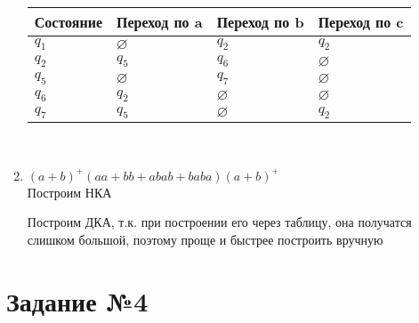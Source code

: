 \documentclass{article}
\begin{document}
\begin{enumerate}
            \begin{tabular} { | l | l | l | l | }
                \hline 
                Состояние & Переход по a & Переход по b & Переход по c \\ \hline
                $q_1$ & $\varnothing$ & $q_2$ & $q_2$ \\ \hline
                $q_2$ & $q_5$ & $q_6$ & $\varnothing$ \\ \hline
                $q_5$ & $\varnothing$ & $q_7$ & $\varnothing$ \\ \hline
                $q_6$ & $q_2$ & $\varnothing$ & $\varnothing$ \\ \hline
                $q_7$ & $q_5$ & $\varnothing$ & $q_2$ \\
                \hline
            \end{tabular} \\  
            
            \begin{center}
            \end{center}
           
            
        \item $(a+b)^+(aa + bb + abab + baba)(a + b)^+$ \\
            Построим НКА
            \begin{center}
            \end{center}
            Построим ДКА, т.к. при построении его через таблицу, она получатся слишком большой, поэтому проще и быстрее построить вручную
            
            \begin{center}
            \end{center}
            
    \end{enumerate}
    
\section*{\huge{Задание №4}}
\end{document}
